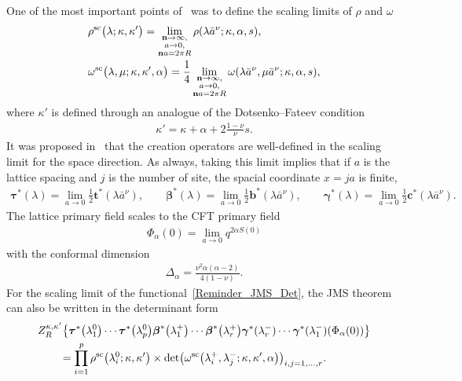\documentclass[pdftex]{sigma}
\numberwithin{equation}{section}
\begin{document}
One of the most important points of~\cite{HGS_4} was to define the scaling limits of $\rho$ and $\omega$
\begin{align*}
&\rho^{{\rm sc}}\bigl(\lambda; \kappa, \kappa'\bigr)=
    \lim\limits_{\substack{\textbf{n}\rightarrow\infty,\\ a\rightarrow 0,\\ \mathbf{n}a=2\pi R}}
    \rho(\lambda\bar{a}^\nu; \kappa, \alpha, s), \\
&\omega^{{\rm sc}}\bigl(\lambda, \mu; \kappa, \kappa', \alpha\bigr) = \frac{1}{4}
    \lim\limits_{\substack{\textbf{n}\rightarrow\infty,\\ a\rightarrow 0,\\ \mathbf{n}a=2\pi R}}
     \omega(\lambda\bar{a}^\nu, \mu\bar{a}^\nu; \kappa, \alpha, s),
\end{align*}
where $\kappa'$ is defined through an analogue of the Dotsenko--Fateev condition
\begin{align*}
\kappa'=\kappa+\alpha+2\frac{1-\nu}{\nu}s.
\end{align*}
It was proposed in~\cite{HGS_4} that the creation operators are well-defined in the scaling limit for the space direction. As always, taking this limit implies that if $a$ is the lattice spacing and $j$ is the number of site, the spacial coordinate $x=ja$ is finite,
\begin{align*}
\boldsymbol{\tau}^{*}(\lambda)  =\lim\limits_{a\rightarrow 0}\frac{1}{2}\mathbf{t}^* (\lambda \bar{a}^\nu),
\qquad
\boldsymbol{\beta}^{*}(\lambda) =\lim\limits_{a\rightarrow 0}\frac{1}{2}\mathbf{b}^* (\lambda \bar{a}^\nu),
\qquad
\boldsymbol{\gamma}^{*}(\lambda)=\lim\limits_{a\rightarrow 0}\frac{1}{2}\mathbf{c}^* (\lambda \bar{a}^\nu).
\end{align*}
The lattice primary field scales to the CFT primary field
\begin{align*}
\Phi_\alpha(0)=\lim_{a\rightarrow0} q^{2\alpha S(0)}
\end{align*}
with the conformal dimension
\begin{align}\label{Reminder_CFTDim}
\Delta_\alpha=\frac{\nu^2 \alpha(\alpha-2)}{4(1-\nu)}.
\end{align}
For the scaling limit of the functional~\eqref{Reminder_JMS_Det}, the JMS theorem can also be written in the determinant form
\begin{align*}
&Z_R^{\kappa, \kappa'} \bigl\{
    \boldsymbol{\tau}^{*}\bigl(\lambda^0_1\bigr)\cdots \boldsymbol{\tau}^{*}\bigl(\lambda^0_p\bigr)
    \boldsymbol{\beta}^{*}\bigl(\lambda^+_1\bigr)\cdots \boldsymbol{\beta}^{*}\bigl(\lambda^+_r\bigr)
    \boldsymbol{\gamma}^{*}(\lambda^-_r)\cdots \boldsymbol{\gamma}^{*}(\lambda^-_1)
    (\Phi_\alpha(0))
\bigr\}\\
&\qquad{}=\prod_{i=1}^{p}\rho^{{\rm sc}}\bigl(\lambda^0_i; \kappa, \kappa'\bigr) \times \det\bigl(\omega^{{\rm sc}}\bigl(\lambda^+_i, \lambda^-_j; \kappa, \kappa', \alpha\bigr)\bigr)_{i,j=1, \dots, r}. \nonumber
\end{align*}
\end{document}
